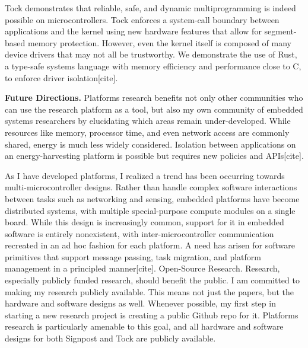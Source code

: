 \documentclass[11pt]{article} %
\begin{document}
Tock demonstrates that reliable, safe, and dynamic multiprogramming is indeed
possible on microcontrollers. Tock enforces a system-call boundary between
applications and the kernel using new hardware features that allow for
segment-based memory protection. However, even the kernel itself is composed of
many device drivers that may not all be trustworthy. We demonstrate the use of
Rust, a type-safe systems language with memory efficiency and performance close
to C, to enforce driver isolation[cite].

\textbf{Future Directions.} Platforms research benefits not only other communities who
can use the research platform as a tool, but also my own community of embedded
systems researchers by elucidating which areas remain under-developed. While
resources like memory, processor time, and even network access are commonly
shared, energy is much less widely considered. Isolation between applications
on an energy-harvesting platform is possible but requires new policies and
APIs[cite].

As I have developed platforms, I realized a trend has been occurring towards
multi-microcontroller designs. Rather than handle complex software interactions
between tasks such as networking and sensing, embedded platforms have become
distributed systems, with multiple special-purpose compute modules on a single
board. While this design is increasingly common, support for it in embedded
software is entirely nonexistent, with inter-microcontroller communication
recreated in an ad hoc fashion for each platform. A need has arisen for
software primitives that support message passing, task migration, and platform
management in a principled manner[cite]. Open-Source Research. Research,
especially publicly funded research, should benefit the public. I am committed
to making my research publicly available. This means not just the papers, but
the hardware and software designs as well. Whenever possible, my first step in
starting a new research project is creating a public Github repo for it.
Platforms research is particularly amenable to this goal, and all hardware and
software designs for both Signpost and Tock are publicly available.
\end{document}
